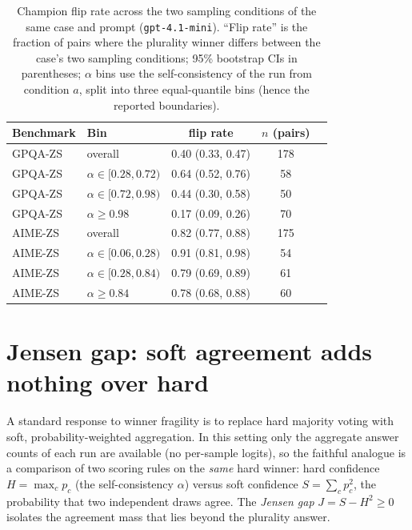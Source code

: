 \documentclass{article}
\begin{document}
\begin{table}[H]
\centering
\caption{Champion flip rate across the two sampling conditions of the
same case and prompt (\texttt{gpt-4.1-mini}). ``Flip rate'' is the fraction of
pairs where the plurality winner differs between the case's two sampling
conditions; 95\% bootstrap CIs in parentheses; $\alpha$ bins use the
self-consistency of the run from condition $a$, split into three
equal-quantile bins (hence the reported boundaries).}
\label{tab:fragility}
\begin{tabular}{llccc}
\toprule
Benchmark & Bin & flip rate & $n$ (pairs) \\
\midrule
GPQA-ZS & overall & 0.40 (0.33, 0.47) & 178 \\
GPQA-ZS & $\alpha\in[0.28,0.72)$ & 0.64 (0.52, 0.76) & 58 \\
GPQA-ZS & $\alpha\in[0.72,0.98)$ & 0.44 (0.30, 0.58) & 50 \\
GPQA-ZS & $\alpha\geq0.98$ & 0.17 (0.09, 0.26) & 70 \\
\midrule
AIME-ZS & overall & 0.82 (0.77, 0.88) & 175 \\
AIME-ZS & $\alpha\in[0.06,0.28)$ & 0.91 (0.81, 0.98) & 54 \\
AIME-ZS & $\alpha\in[0.28,0.84)$ & 0.79 (0.69, 0.89) & 61 \\
AIME-ZS & $\alpha\geq0.84$ & 0.78 (0.68, 0.88) & 60 \\
\bottomrule
\end{tabular}
\end{table}

\section{Jensen gap: soft agreement adds nothing over hard}
\label{app:jensen}

A standard response to winner fragility is to replace hard majority
voting with soft, probability-weighted aggregation. In this setting only
the aggregate answer counts of each run are available (no per-sample
logits), so the faithful analogue is a comparison of two scoring rules on
the \emph{same} hard winner: hard confidence $H=\max_c p_c$ (the self-consistency $\alpha$) versus soft confidence $S=\sum_c p_c^2$, the
probability that two independent draws agree. The \emph{Jensen gap}
$J = S - H^2 \ge 0$ isolates the agreement mass that lies beyond the
plurality answer.
\end{document}
